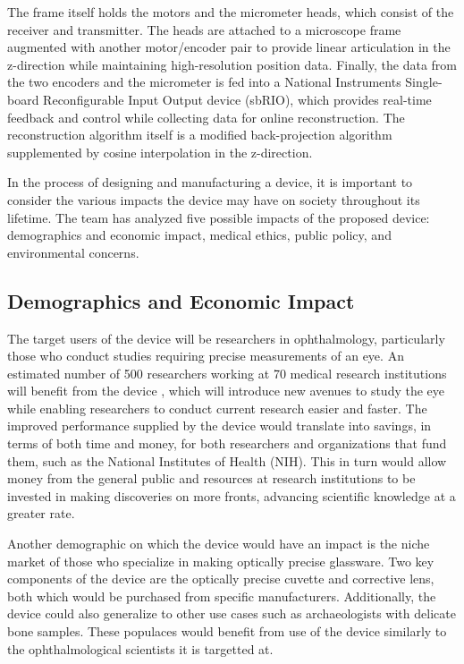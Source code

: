 \documentclass{article}
\begin{document}
The frame itself holds the motors and the micrometer heads, which
consist of the receiver and transmitter. The heads are attached to a
microscope frame augmented with another motor/encoder pair to provide
linear articulation in the z-direction while maintaining
high-resolution position data. Finally, the data from the two encoders
and the micrometer is fed into a National Instruments Single-board
Reconfigurable Input Output device (sbRIO), which provides real-time
feedback and control while collecting data for online
reconstruction. The reconstruction algorithm itself is a modified
back-projection algorithm supplemented by cosine interpolation in the
z-direction.
 
In the process of designing and manufacturing a device, it is
important to consider the various impacts the device may have on
society throughout its lifetime. The team has analyzed five possible
impacts of the proposed device: demographics and economic impact,
medical ethics, public policy, and environmental concerns.
 
 
\subsection{Demographics and Economic Impact}
\label{sec:Demographics}
 
The target users of the device will be researchers in ophthalmology,
particularly those who conduct studies requiring precise measurements
of an eye. An estimated number of 500 researchers working at 70
medical research institutions will benefit from the device
\cite{Nickerson}, which will introduce new avenues to study the eye
while enabling researchers to conduct current research easier and
faster.  The improved performance supplied by
the device would translate into savings, in terms of both time and
money, for both researchers and organizations that fund them, such as
the National Institutes of Health (NIH). This in turn would allow money from the general public
and resources at research institutions to be invested in making
discoveries on more fronts, advancing scientific knowledge at a
greater rate.
 
Another demographic on which the device would have an impact is the
niche market of those who specialize in making optically precise
glassware. Two key components of the device are the optically precise
cuvette and corrective lens, both which would be purchased from
specific manufacturers. Additionally, the device could also
generalize to other use cases such as archaeologists with delicate
bone samples. These
populaces would benefit from use of the device similarly to the
ophthalmological scientists it is targetted at.
\end{document}
